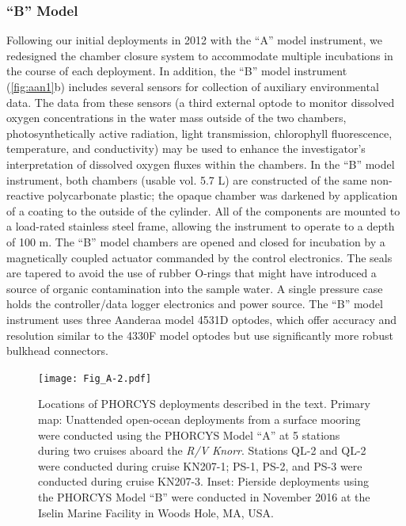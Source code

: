 \subsubsection{``B'' Model}
Following our initial deployments in 2012 with the ``A'' model instrument, we redesigned the chamber closure system to accommodate multiple incubations in the course of each deployment. In addition, the ``B'' model instrument (\autoref{fig:aan1}b) includes several sensors for collection of auxiliary environmental data. The data from these sensors (a third external optode to monitor dissolved oxygen concentrations in the water mass outside of the two chambers, photosynthetically active radiation, light transmission, chlorophyll fluorescence, temperature, and conductivity) may be used to enhance the investigator's interpretation of dissolved oxygen fluxes within the chambers. In the ``B'' model instrument, both chambers (usable vol. 5.7 L) are constructed of the same non-reactive polycarbonate plastic; the opaque chamber was darkened by application of a coating to the outside of the cylinder. All of the components are mounted to a load-rated stainless steel frame, allowing the instrument to operate to a depth of 100 m. The ``B'' model chambers are opened and closed for incubation by a magnetically coupled actuator commanded by the control electronics. The seals are tapered to avoid the use of rubber O-rings that might have introduced a source of organic contamination into the sample water. A single pressure case holds the controller/data logger electronics and power source. The ``B'' model instrument uses three Aanderaa model 4531D optodes, which offer accuracy and resolution similar to the 4330F model optodes but use significantly more robust bulkhead connectors.
\begin{figure}
\centering
\texttt{[image: Fig\_A-2.pdf]}
\caption[Locations of PHORCYS deployments described in the text]{Locations of PHORCYS deployments described in the text. Primary map: Unattended open-ocean deployments from a surface mooring were conducted using the PHORCYS Model ``A'' at 5 stations during two cruises aboard the \emph{R/V Knorr}. Stations QL-2 and QL-2 were conducted during cruise KN207-1; PS-1, PS-2, and PS-3 were conducted during cruise KN207-3. Inset: Pierside deployments using the PHORCYS Model ``B'' were conducted in November 2016 at the Iselin Marine Facility in Woods Hole, MA, USA.}
\label{fig:aan2}
\end{figure}

